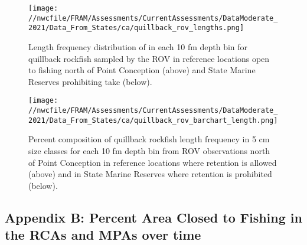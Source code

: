 \documentclass[11pt,
  english,
  a4paper,
]{article}
\begin{document}

\begin{figure}
\centering
\texttt{[image: //nwcfile/FRAM/Assessments/CurrentAssessments/DataModerate\_2021/Data\_From\_States/ca/quillback\_rov\_lengths.png]}
\caption{Length frequency distribution of in each 10 fm depth bin for quillback rockfish sampled by the ROV in reference locations open to fishing north of Point Conception (above) and State Marine Reserves prohibiting take (below).\label{fig:ca-ROV}}
\end{figure}

\tagmcend\tagstructend


\begin{figure}
\centering
\texttt{[image: //nwcfile/FRAM/Assessments/CurrentAssessments/DataModerate\_2021/Data\_From\_States/ca/quillback\_rov\_barchart\_length.png]}
\caption{Percent composition of quillback rockfish length frequency in 5 cm size classes for each 10 fm depth bin from ROV observations north of Point Conception in reference locations where retention is allowed (above) and in State Marine Reserves where retention is prohibited (below).\label{fig:ca-ROV-percent}}
\end{figure}

\tagmcend\tagstructend

\clearpage


\hypertarget{append_b}{%
\subsection{Appendix B: Percent Area Closed to Fishing in the RCAs and MPAs over time}\label{append_b}}

\leavevmode\tagmcend\tagstructend
\end{document}
